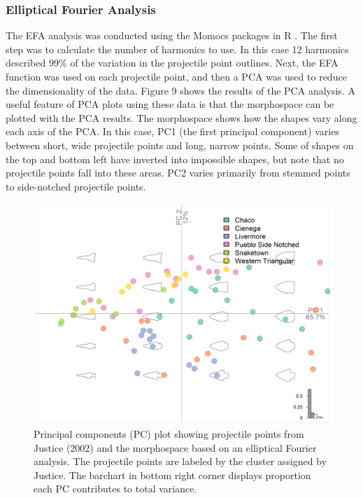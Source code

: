 \documentclass[letterpaper]{article}
\begin{document}
\hypertarget{elliptical-fourier-analysis}{%
\subsubsection*{Elliptical Fourier Analysis}\label{elliptical-fourier-analysis}}

The EFA analysis was conducted using the Momocs packages \autocite{Bonhomme2014-gt} in R \autocite{R_Core_Team2022-wb}. The first step was to calculate the number of harmonics to use. In this case 12 harmonics described 99\% of the variation in the projectile point outlines. Next, the EFA function was used on each projectile point, and then a PCA was used to reduce the dimensionality of the data. Figure 9 shows the results of the PCA analysis. A useful feature of PCA plots using these data is that the morphospace can be plotted with the PCA results. The morphospace shows how the shapes vary along each axis of the PCA. In this case, PC1 (the first principal component) varies between short, wide projectile points and long, narrow points. Some of shapes on the top and bottom left have inverted into impossible shapes, but note that no projectile points fall into these areas. PC2 varies primarily from stemmed points to side-notched projectile points.

\begin{figure}
\includegraphics[width=1\linewidth]{figures/JusticeEFAPCA} \caption{Principal components (PC) plot showing projectile points from Justice (2002) and the morphospace based on an elliptical Fourier analysis. The projectile points are labeled by the cluster assigned by Justice. The barchart in bottom right corner displays proportion each PC contributes to total variance.}\label{fig:JusticeEFAPCA}
\end{figure}
\end{document}

